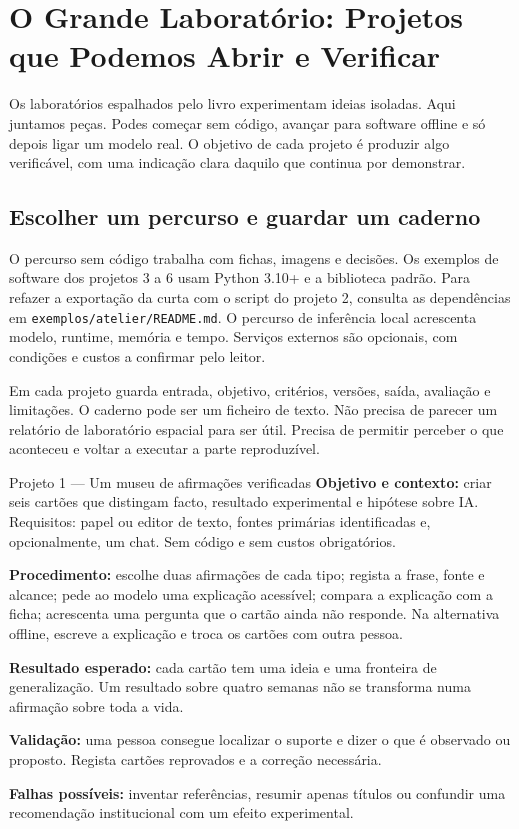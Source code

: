 \chapter{O Grande Laboratório: Projetos que Podemos Abrir e Verificar}
\label{ch:grande-laboratorio}

Os laboratórios espalhados pelo livro experimentam ideias isoladas. Aqui juntamos peças. Podes começar sem código, avançar para software offline e só depois ligar um modelo real. O objetivo de cada projeto é produzir algo verificável, com uma indicação clara daquilo que continua por demonstrar.

\section{Escolher um percurso e guardar um caderno}
O percurso sem código trabalha com fichas, imagens e decisões. Os exemplos de software dos projetos 3 a 6 usam Python 3.10+ e a biblioteca padrão. Para refazer a exportação da curta com o script do projeto 2, consulta as dependências em \nolinkurl{exemplos/atelier/README.md}. O percurso de inferência local acrescenta modelo, runtime, memória e tempo. Serviços externos são opcionais, com condições e custos a confirmar pelo leitor.

Em cada projeto guarda entrada, objetivo, critérios, versões, saída, avaliação e limitações. O caderno pode ser um ficheiro de texto. Não precisa de parecer um relatório de laboratório espacial para ser útil. Precisa de permitir perceber o que aconteceu e voltar a executar a parte reproduzível.

\begin{promptlabbox}{Projeto 1 — Um museu de afirmações verificadas}
\textbf{Objetivo e contexto:} criar seis cartões que distingam facto, resultado experimental e hipótese sobre IA. Requisitos: papel ou editor de texto, fontes primárias identificadas e, opcionalmente, um chat. Sem código e sem custos obrigatórios.

\textbf{Procedimento:} escolhe duas afirmações de cada tipo; regista a frase, fonte e alcance; pede ao modelo uma explicação acessível; compara a explicação com a ficha; acrescenta uma pergunta que o cartão ainda não responde. Na alternativa offline, escreve a explicação e troca os cartões com outra pessoa.

\textbf{Resultado esperado:} cada cartão tem uma ideia e uma fronteira de generalização. Um resultado sobre quatro semanas não se transforma numa afirmação sobre toda a vida.

\textbf{Validação:} uma pessoa consegue localizar o suporte e dizer o que é observado ou proposto. Regista cartões reprovados e a correção necessária.

\textbf{Falhas possíveis:} inventar referências, resumir apenas títulos ou confundir uma recomendação institucional com um efeito experimental.
\end{promptlabbox}

